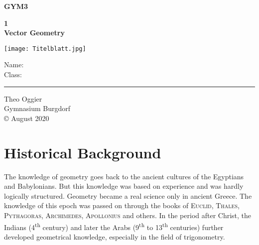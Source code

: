 \documentclass[12pt,eng]{skript_ogg}
\begin{document}
\thispagestyle{empty}
\begin{titlepage}

\begin{center}

\vspace*{0cm} {\setlength{\baselineskip}{8ex}

{\Huge\textbf{GYM3}\\[2.5cm]}

{\Large\textbf{1\\Vector Geometry}}}

\vspace{5mm}

\texttt{[image: Titelblatt.jpg]}
\end{center}

\vfill

{\large Name:\\
Class:}\\
\rule{\textwidth}{0.5pt}

\begin{flushright}
Theo Oggier\\
Gymnasium Burgdorf\\
\vspace{5mm} \copyright\,\,August 2020
\end{flushright}

\end{titlepage}

\tableofcontents        %
\newpage

\clearpage

\section{Historical Background}
The knowledge of geometry goes back to the ancient cultures of the Egyptians and Babylonians. But this knowledge was based on experience and was hardly logically structured. Geometry became a real science only in ancient Greece. The knowledge of this epoch was passed on through the books of \textsc{Euclid}, \textsc{Thales}, \textsc{Pythagoras}, \textsc{Archimedes}, \textsc{Apollonius} and others. In the period after Christ, the Indians (4\textsuperscript{th} century) and later the Arabs (9\textsuperscript{th} to 13\textsuperscript{th} centuries) further developed geometrical knowledge, especially in the field of trigonometry.
\end{document}
